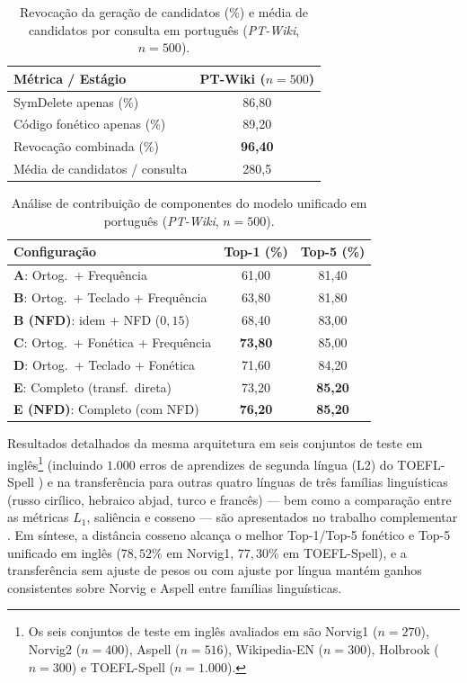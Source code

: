 \documentclass[a4paper, twocolumn, 11pt, twoside]{article}
\begin{document}
\begin{table}[ht]
\centering
\scriptsize
\setlength{\tabcolsep}{4pt}
\caption{Revocação da geração de candidatos (\%) e média de candidatos por consulta em português (\textit{PT-Wiki}, $n=500$).}
\label{tab:recall_pt}
\begin{tabular}{lc}
\toprule
Métrica / Estágio & PT-Wiki ($n=500$) \\
\midrule
SymDelete apenas (\%)      & 86,80 \\
Código fonético apenas (\%) & 89,20 \\
Revocação combinada (\%)   & \textbf{96,40} \\
Média de candidatos / consulta & 280,5 \\
\bottomrule
\end{tabular}
\end{table}

\begin{table}[ht]
\centering
\scriptsize
\setlength{\tabcolsep}{3pt}
\caption{Análise de contribuição de componentes do modelo unificado em português (\textit{PT-Wiki}, $n=500$).}
\label{tab:comp_pt}
\begin{tabular}{lcc}
\toprule
Configuração & Top-1 (\%) & Top-5 (\%) \\
\midrule
\textbf{A}: Ortog.\ + Frequência                    & 61,00 & 81,40 \\
\textbf{B}: Ortog.\ + Teclado + Frequência          & 63,80 & 81,80 \\
\textbf{B (NFD)}: idem + NFD ($0{,}15$) & 68,40 & 83,00 \\
\textbf{C}: Ortog.\ + Fonética + Frequência         & \textbf{73,80} & 85,00 \\
\textbf{D}: Ortog.\ + Teclado + Fonética            & 71,60 & 84,20 \\
\textbf{E}: Completo (transf.\ direta)     & 73,20 & \textbf{85,20} \\
\textbf{E (NFD)}: Completo (com NFD)       & \textbf{76,20} & \textbf{85,20} \\
\bottomrule
\end{tabular}
\end{table}

Resultados detalhados da mesma arquitetura em seis conjuntos de teste em inglês\footnote{Os seis conjuntos de teste em inglês avaliados em \citet{araujo2026lipspell} são Norvig1 ($n=270$), Norvig2 ($n=400$), Aspell ($n=516$), Wikipedia-EN ($n=300$), Holbrook ($n=300$) e TOEFL-Spell ($n=1.000$).} (incluindo $1.000$ erros de aprendizes de segunda língua (L2) do TOEFL-Spell \citep{flor2019toefl}) e na transferência para outras quatro línguas de três famílias linguísticas (russo cirílico, hebraico abjad, turco e francês) --- bem como a comparação entre as métricas $L_1$, saliência e cosseno --- são apresentados no trabalho complementar \citep{araujo2026lipspell}. Em síntese, a distância cosseno alcança o melhor Top-1/Top-5 fonético e Top-5 unificado em inglês ($78{,}52\%$ em Norvig1, $77{,}30\%$ em TOEFL-Spell), e a transferência sem ajuste de pesos ou com ajuste por língua mantém ganhos consistentes sobre Norvig e Aspell entre famílias linguísticas.
\end{document}
